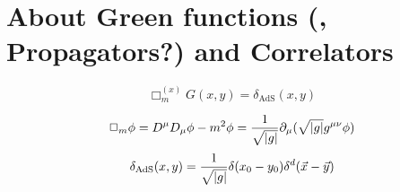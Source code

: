 \section{About Green functions (, Propagators?) and Correlators}
\begin{equation}\label{eq:geq}
\Box_m^{(x)}G(x,y)=\delta_{\mathrm{AdS}}(x,y)
\end{equation}

$$\Box_m\phi=D^\mu D_\mu \phi - m^2 \phi = \frac{1}{\sqrt{|g|}}\partial_{\mu}(\sqrt{|g|} g^{\mu\nu}\phi)$$
$$\delta_{\mathrm{AdS}}(x,y)=\frac{1}{\sqrt{|g|}}\delta(x_0-y_0)\delta^d(\vec{x}-\vec{y})$$
